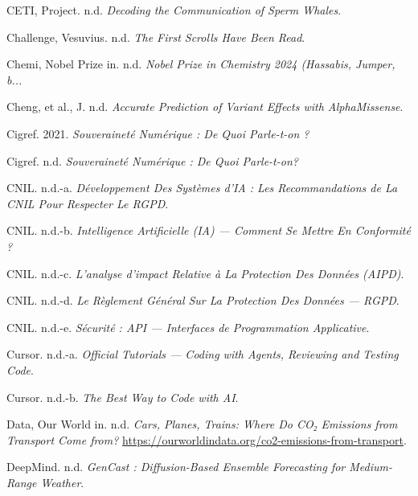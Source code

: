 \documentclass[
  10pt,
  a4paper,
  DIV=11,
  numbers=noendperiod,
  oneside]{scrreprt}
\newlength{\cslhangindent}
\newenvironment{CSLReferences}[2] %
 {\begin{list}{}{%
  \setlength{\itemindent}{0pt}
  \setlength{\leftmargin}{0pt}
  \setlength{\parsep}{0pt}
  \ifodd #1
   \setlength{\leftmargin}{\cslhangindent}
   \setlength{\itemindent}{-1\cslhangindent}
  \fi
  \setlength{\itemsep}{#2\baselineskip}}}
 {\end{list}}
\let\oldemph\emph
\renewcommand{\emph}[1]{\oldemph{\textcolor{cmmgray}{#1}}}
\begin{document}
\begin{CSLReferences}{1}{1}
CETI, Project. n.d. \emph{Decoding the Communication of Sperm Whales}.

Challenge, Vesuvius. n.d. \emph{The First Scrolls Have Been Read}.

Chemi, Nobel Prize in. n.d. \emph{Nobel Prize in Chemistry 2024
(Hassabis, Jumper, b...}

{Cheng, et al., J.} n.d. \emph{Accurate Prediction of Variant Effects
with AlphaMissense}.

Cigref. 2021. \emph{Souveraineté Numérique : De Quoi Parle-t-on ?}

Cigref. n.d. \emph{Souveraineté Numérique : De Quoi Parle-t-on?}

CNIL. n.d.-a. \emph{Développement Des Systèmes d'IA : Les
Recommandations de La CNIL Pour Respecter Le RGPD}.

CNIL. n.d.-b. \emph{Intelligence Artificielle (IA) --- Comment Se Mettre
En Conformité ?}

CNIL. n.d.-c. \emph{L'analyse d'impact Relative à La Protection Des
Données (AIPD)}.

CNIL. n.d.-d. \emph{Le Règlement Général Sur La Protection Des Données
--- RGPD}.

CNIL. n.d.-e. \emph{Sécurité : API --- Interfaces de Programmation
Applicative}.

Cursor. n.d.-a. \emph{Official Tutorials --- Coding with Agents,
Reviewing and Testing Code}.

Cursor. n.d.-b. \emph{The Best Way to Code with AI}.

Data, Our World in. n.d. \emph{Cars, Planes, Trains: Where Do CO₂
Emissions from Transport Come from?}
\url{https://ourworldindata.org/co2-emissions-from-transport}.

DeepMind. n.d. \emph{GenCast : Diffusion-Based Ensemble Forecasting for
Medium-Range Weather}.


\end{CSLReferences}
\end{document}
